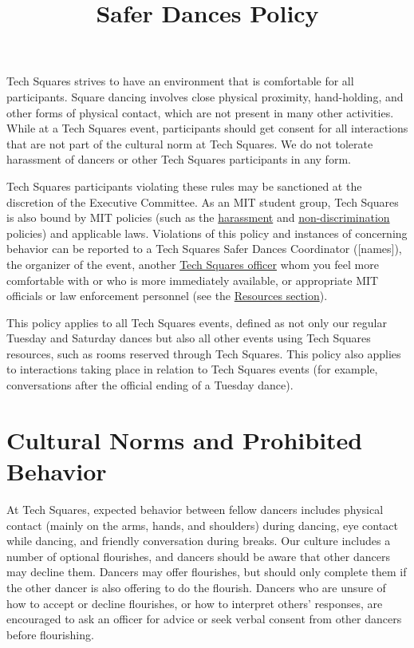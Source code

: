 \documentclass{article}
\title{Safer Dances Policy}
\date{}
\begin{document}
\maketitle

Tech Squares strives to have an environment that is comfortable for all participants. Square dancing involves close physical proximity, hand-holding, and other forms of physical contact, which are not present in many other activities. While at a Tech Squares event, participants should get consent for all interactions that are not part of the cultural norm at Tech Squares. We do not tolerate harassment of dancers or other Tech Squares participants in any form.

Tech Squares participants violating these rules may be sanctioned at the discretion of the Executive Committee. As an MIT student group, Tech Squares is also bound by MIT policies (such as the \href{http://handbook.mit.edu/harassment}{harassment} and \href{http://web.mit.edu/referencepubs/nondiscrimination/}{non-discrimination} policies) and applicable laws. Violations of this policy and instances of concerning behavior can be reported to a Tech Squares Safer Dances Coordinator ([names]), the organizer of the event, another \href{http://www.mit.edu/\~{}tech-squares/officers.html}{Tech Squares officer} whom you feel more comfortable with or who is more immediately available, or appropriate MIT officials or law enforcement personnel (see the \hyperref[sec:resources]{Resources section}).

This policy applies to all Tech Squares events, defined as not only our regular Tuesday and Saturday dances but also all other events using Tech Squares resources, such as rooms reserved through Tech Squares. This policy also applies to interactions taking place in relation to Tech Squares events (for example, conversations after the official ending of a Tuesday dance).

\section{Cultural Norms and Prohibited Behavior}

At Tech Squares, expected behavior between fellow dancers includes physical contact (mainly on the arms, hands, and shoulders) during dancing, eye contact while dancing, and friendly conversation during breaks. Our culture includes a number of optional flourishes, and dancers should be aware that other dancers may decline them. Dancers may offer flourishes, but should only complete them if the other dancer is also offering to do the flourish. Dancers who are unsure of how to accept or decline flourishes, or how to interpret others' responses, are encouraged to ask an officer for advice or seek verbal consent from other dancers before flourishing.
\end{document}
